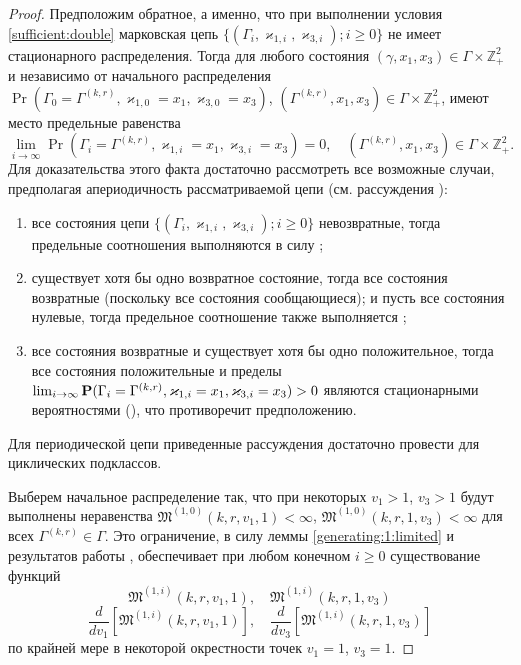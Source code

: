 \documentclass{report}
\begin{document}
\begin{proof}
Предположим обратное, а именно, что при выполнении условия \eqref{sufficient:double} марковская цепь $\{(\Gamma_i, \varkappa_{1,i},\varkappa_{3,i}); i \geqslant 0\}$ не имеет стационарного распределения. 
Тогда для любого состояния $(\gamma,x_1,x_3)\in \Gamma \times {\mathbb Z}^2_+$ и независимо от начального распределения $\Pr(\Gamma_{0}=\Gamma^{(k,r)}, \varkappa_{1,0}=x_1, \varkappa_{3,0}=x_3)$,
$(\Gamma^{(k,r)},x_1,x_3)\in \Gamma \times {\mathbb Z}^2_+$, 
имеют место предельные равенства 
\begin{equation}
\lim_{i \to \infty} \Pr(\Gamma_{i}=\Gamma^{(k,r)}, \varkappa_{1,i}=x_1, \varkappa_{3,i}=x_3) =0, \quad  (\Gamma^{(k,r)},x_1,x_3)\in \Gamma \times {\mathbb Z}^2_+.
\label{zero:limit:equations:1}
\end{equation} 
Для доказательства этого факта достаточно рассмотреть все возможные случаи, предполагая апериодичность рассматриваемой цепи (см. рассуждения \cite[гл. $3$, \linebreak \S~3-4]{Shiryaev}):
\begin{enumerate}
\item все состояния цепи $\{(\Gamma_i, \varkappa_{1,i},\varkappa_{3,i}); i \geqslant 0\}$ невозвратные, тогда предельные соотношения выполняются в силу \cite[с. 541, лемма $2$]{Shiryaev};
\item существует хотя бы одно возвратное состояние, тогда все состояния возвратные (поскольку все состояния сообщающиеся); и пусть все состояния нулевые, тогда предельное соотношение также выполняется \cite[с. 541, лемма $3$]{Shiryaev};
\item все состояния возвратные и существует хотя бы одно положительное, тогда все состояния положительные и пределы $\lim_{i \to \infty} \Pr(\Gamma_{i}\hm= \Gamma^{(k,r)}, \varkappa_{1,i}\hm= x_1, \varkappa_{3,i}\hm= x_3) > 0$ являются стационарными вероятностями ({\cite[с. 549, теорема $1$]{Shiryaev}}), что противоречит предположению.
\end{enumerate}
Для периодической цепи приведенные рассуждения достаточно провести для циклических подклассов.

Выберем начальное распределение так, что при некоторых $v_1 >1$, $v_3 >1$ будут выполнены неравенства $\mathfrak{M}^{(1,0)}(k,r,v_1,1) <\infty$, $\mathfrak{M}^{(1,0)}(k,r,1,v_3) <\infty$ для всех $\Gamma^{(k,r)}\in \Gamma$. Это ограничение, в силу леммы \eqref{generating:1:limited} и результатов работы \cite{Kocheganov:2017:1}, обеспечивает при любом конечном $i\geqslant 0$ существование функций 
\begin{equation}
\mathfrak{M}^{(1,i)}(k,r,v_1,1), \quad \mathfrak{M}^{(1,i)}(k,r,1,v_3)
\end{equation}
\begin{equation}
\frac{d}{dv_1} \left[\mathfrak{M}^{(1,i)}(k,r,v_1,1)\right], \quad \frac{d}{dv_3} \left[\mathfrak{M}^{(1,i)}(k,r,1,v_3)\right]
\end{equation}
по крайней мере в некоторой окрестности точек $v_1 = 1$, $v_3=1$.


\end{proof}
\end{document}

